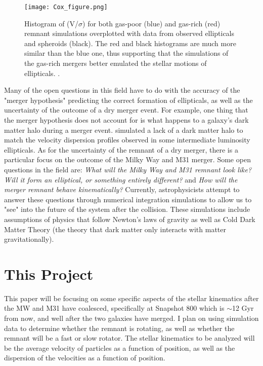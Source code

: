 \documentclass[twocolumn]{aastex63}
\begin{document}
\begin{figure}
    \centering
    \texttt{[image: Cox\_figure.png]}
    \caption{Histogram of (V/$\sigma$) for both gas-poor (blue) and gas-rich (red) remnant simulations overplotted with data from observed ellipticals and spheroids (black).  The red and black histograms are much more similar than the blue one, thus supporting that the simulations of the gas-rich mergers better emulated the stellar motions of ellipticals. \citep{2006ApJ...650..791C}.}
    \label{fig:my_label}
\end{figure}

Many of the open questions in this field have to do with the accuracy of the "merger hypothesis" predicting the correct formation of ellipticals, as well as the uncertainty of the outcome of a dry merger event.  For example, one thing that the merger hypothesis does not account for is what happens to a galaxy's dark matter halo during a merger event. \cite{2003Sci...301.1696R} simulated a lack of a dark matter halo to match the velocity dispersion profiles observed in some intermediate luminosity ellipticals. As for the uncertainty of the remnant of a dry merger, there is a particular focus on the outcome of the Milky Way and M31 merger.  Some open questions in the field are: \textit{What will the Milky Way and M31 remnant look like?} \textit{Will it form an elliptical, or something entirely different?} and \textit{How will the merger remnant behave kinematically?}  Currently, astrophysicists attempt to answer these questions through numerical integration simulations to allow us to "see" into the future of the system after the collision.  These simulations include assumptions of physics that follow Newton's laws of gravity as well as Cold Dark Matter Theory (the theory that dark matter only interacts with matter gravitationally).    

\section{This Project} \label{sec:style}

This paper will be focusing on some specific aspects of the stellar kinematics after the MW and M31 have coalesced, specifically at Snapshot 800 which is $\sim$12 Gyr from now, and well after the two galaxies have merged.  I plan on using simulation data to determine whether the remnant is rotating, as well as whether the remnant will be a fast or slow rotator.  The stellar kinematics to be analyzed will be the average velocity of particles as a function of position, as well as the dispersion of the velocities as a function of position.
\end{document}
